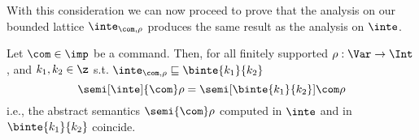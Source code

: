 With this consideration we can now proceed to prove that the analysis
on our bounded lattice \(\inte_{\com,\rho}\) produces the same result
as the analysis on \(\inte\).


\begin{theorem}
  Let \(\com\in \imp\) be a command. Then, for all finitely supported
  \(\rho : \Var \to \Int\), and \(k_1, k_2\in \z\) s.t.
  \(\inte_{\com,\rho} \sqsubseteq \binte{k_1}{k_2} \)
  \begin{equation*}
    \semi[\inte]{\com}\rho = \semi[\binte{k_1}{k_2}]{\com}\rho
  \end{equation*}
  i.e., the abstract semantics \(\semi{\com} \rho\)
  computed in \(\inte\) and in \(\binte{k_1}{k_2}\) coincide.
\end{theorem}

